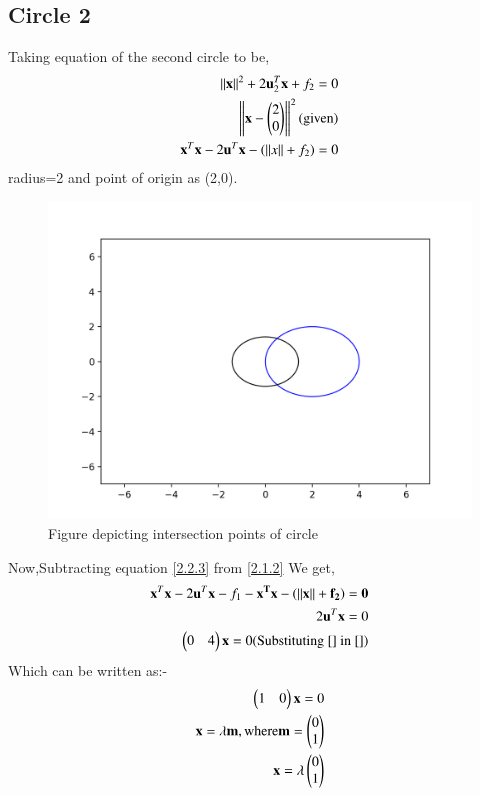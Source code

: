 \documentclass[journal,12pt,twocolumn]{IEEEtran}
\begin{document}
 \subsection{Circle 2}
Taking equation of the second circle to be,
\begin{align}
\left\lVert\mathbf{x}\right\rVert^2 + 2\mathbf{u}_2^T\mathbf{x} + f_2 = 0\\
  \left\lVert\mathbf{x}-\begin{pmatrix}2\\0\end{pmatrix}\right\rVert^2 \text{(given)}\\
  {\mathbf{x}^{T}\mathbf{x}-2\mathbf{u}^T\mathbf{x}}-(\left\lVert x\right\rVert+f_2)=0
  \end{align}
radius=2 and point of origin as (2,0).
 \begin{figure}[h!]
	\centering
	\includegraphics[width=\columnwidth]{Assignment_5.png}
	\caption{Figure depicting intersection points of circle}
	\label{myfig}
\end{figure}
Now,Subtracting equation \eqref{2.2.3} from \eqref{2.1.2} We get,
 \begin{align}
 {\mathbf{x}^{T}\mathbf{x}-2\mathbf{u}^T\mathbf{x}}-f_1-\bf{x}^{T}\bf{x}-(\left\lVert x\right\rVert+f_2)=0\\
 2\mathbf{u}^{T}\mathbf{x}=0\\
 \begin{pmatrix}0&4\end{pmatrix}\mathbf{x}=0\text{(Substituting \eqref{} in \eqref{})}
 \end{align}
 Which can be written as:-
 \begin{align}
 \begin{pmatrix}1&0\end{pmatrix}\mathbf{x}=0\\
 \mathbf{x} = \lambda \mathbf{m}, \text{where} \mathbf{m} = \begin{pmatrix}0\\1\end{pmatrix}\\
 \mathbf{x} = \lambda \begin{pmatrix}0\\1\end{pmatrix}
 \end{align}
\end{document}
